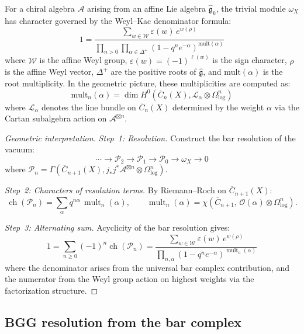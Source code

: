 \begin{theorem}\label{thm:weyl-kac-denominator}
For a chiral algebra $\mathcal{A}$ arising from an affine Lie algebra $\hat{\mathfrak{g}}_k$, the trivial module $\omega_X$ has character governed by the Weyl--Kac denominator formula:
\[
1 = \frac{\sum_{w \in \mathcal{W}} \varepsilon(w)\, e^{w(\rho)}}{\prod_{n > 0} \prod_{\alpha \in \Delta^+} (1 - q^n e^{-\alpha})^{\mathrm{mult}(\alpha)}}
\]
where $\mathcal{W}$ is the affine Weyl group, $\varepsilon(w) = (-1)^{\ell(w)}$ is the sign character, $\rho$ is the affine Weyl vector, $\Delta^+$ are the positive roots of $\hat{\mathfrak{g}}$, and $\mathrm{mult}(\alpha)$ is the root multiplicity.  In the geometric picture, these multiplicities are computed as:
\[
\mathrm{mult}_n(\alpha) = \dim H^0(\overline{C}_n(X), \mathcal{L}_\alpha \otimes \Omega^n_{\log})
\]
where $\mathcal{L}_\alpha$ denotes the line bundle on $\overline{C}_n(X)$ determined by the weight $\alpha$ via the Cartan subalgebra action on $\mathcal{A}^{\boxtimes n}$.
\end{theorem}

\begin{proof}[Geometric interpretation]
\emph{Step~1: Resolution.}
Construct the bar resolution of the vacuum:
\[
\cdots \to \mathcal{P}_2 \to \mathcal{P}_1 \to \mathcal{P}_0
\to \omega_X \to 0
\]
where $\mathcal{P}_n = \Gamma(\overline{C}_{n+1}(X),
j_*j^*\mathcal{A}^{\boxtimes n} \otimes \Omega^n_{\log})$.

\emph{Step~2: Characters of resolution terms.}
By Riemann--Roch on $\overline{C}_{n+1}(X)$:
\[
\operatorname{ch}(\mathcal{P}_n)
= \sum_{\alpha} q^{n\alpha}\, \operatorname{mult}_n(\alpha), \qquad
\operatorname{mult}_n(\alpha)
= \chi(\overline{C}_{n+1},\, \mathcal{O}(\alpha)
\otimes \Omega^n_{\log}).
\]

\emph{Step~3: Alternating sum.}
Acyclicity of the bar resolution gives:
\[
1 = \sum_{n \geq 0} (-1)^n \operatorname{ch}(\mathcal{P}_n)
= \frac{\sum_{w \in \mathcal{W}} \varepsilon(w)\, e^{w(\rho)}}
  {\prod_{n,\alpha} (1 - q^n e^{-\alpha})^{\operatorname{mult}_n(\alpha)}}
\]
where the denominator arises from the universal bar complex
contribution, and the numerator from the Weyl group action on
highest weights via the factorization structure.
\end{proof}

\subsection{BGG resolution from the bar complex}

